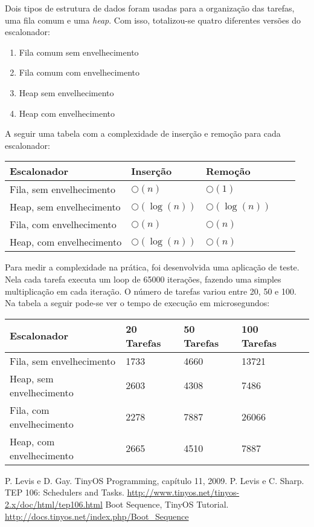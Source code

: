 \documentclass[a4paper,onecolumn, 10pt]{article}
\begin{document}
Dois tipos de estrutura de dados foram usadas para a organização das tarefas, uma fila comum e uma \textit{heap}. Com
isso, totalizou-se quatro diferentes versões do escalonador:
\begin{enumerate}
    \item Fila comum sem envelhecimento
    \item Fila comum com envelhecimento
    \item Heap sem envelhecimento
    \item Heap com envelhecimento
\end{enumerate}
A seguir uma tabela com a complexidade de inserção e remoção para cada escalonador:
\begin{center}
    \begin{tabular}{ | l | l | l | l | p{5cm} |}
    \hline
    Escalonador & Inserção & Remoção \\ \hline
    Fila, sem envelhecimento & $\bigcirc(n)$ & $\bigcirc(1)$ \\ \hline 
    Heap, sem envelhecimento & $\bigcirc(\log(n))$ & $\bigcirc(\log(n))$ \\ \hline
    Fila, com envelhecimento & $\bigcirc(n)$ & $\bigcirc(n)$ \\ \hline
    Heap, com envelhecimento & $\bigcirc(\log(n))$ & $\bigcirc(n)$ \\ \hline
    \end{tabular}
\end{center}
Para medir a complexidade na prática, foi desenvolvida uma aplicação de teste. Nela cada tarefa executa um loop de 65000
iterações, fazendo uma simples multiplicação em cada iteração. O número de tarefas variou entre 20, 50 e 100.
Na tabela a seguir pode-se ver o tempo de execução em microsegundos:
\begin{center}
    \begin{tabular}{ | l | l | l | l | p{5cm} |}
    \hline
    Escalonador              & 20 Tarefas & 50 Tarefas & 100 Tarefas \\ \hline
    Fila, sem envelhecimento & 1733 & 4660 & 13721 \\ \hline 
    Heap, sem envelhecimento & 2603 & 4308 & 7486 \\ \hline
    Fila, com envelhecimento & 2278 & 7887 & 26066 \\ \hline
    Heap, com envelhecimento & 2665 & 4510 & 7887 \\ \hline
    \end{tabular}
\end{center}
\pagebreak

\begin{thebibliography}{9}
 P. Levis e D. Gay. TinyOS Programming, capítulo 11, 2009.
 P. Levis e C. Sharp. TEP 106: Schedulers and Tasks.
                    \url{http://www.tinyos.net/tinyos-2.x/doc/html/tep106.html}
 Boot Sequence, TinyOS Tutorial. \url{http://docs.tinyos.net/index.php/Boot_Sequence}
\end{thebibliography}
\end{document}
